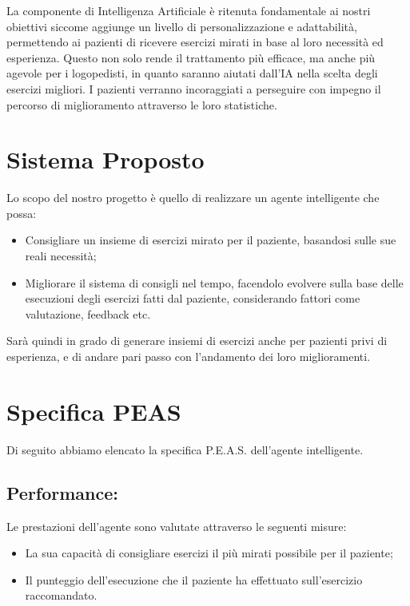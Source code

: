 \documentclass{article}
\begin{document}
    La componente di Intelligenza Artificiale è ritenuta fondamentale ai nostri obiettivi siccome aggiunge un livello di personalizzazione e adattabilità, permettendo ai pazienti di ricevere esercizi mirati in base al loro necessità ed esperienza. Questo non solo rende il trattamento più efficace, ma anche più agevole per i logopedisti, in quanto saranno aiutati dall'IA nella scelta degli esercizi migliori. I pazienti verranno incoraggiati a perseguire con impegno il percorso di miglioramento attraverso le loro statistiche.

    \section{Sistema Proposto}

    Lo scopo del nostro progetto è quello di realizzare un agente intelligente che possa:

    \begin{itemize}
        \item Consigliare un insieme di esercizi mirato per il paziente, basandosi sulle sue reali necessità;
        \item Migliorare il sistema di consigli nel tempo, facendolo evolvere sulla base delle esecuzioni degli esercizi fatti dal paziente, considerando fattori come valutazione, feedback etc.
    \end{itemize}

    Sarà quindi in grado di generare insiemi di esercizi anche per pazienti privi di esperienza, e di andare pari passo con l'andamento dei loro miglioramenti.

    \pagebreak

    \section{Specifica PEAS}

    Di seguito abbiamo elencato la specifica P.E.A.S. dell'agente intelligente.

    \subsection{Performance:}

    Le prestazioni dell’agente sono valutate attraverso le seguenti misure:

    \begin{itemize}
        \item La sua capacità di consigliare esercizi il più mirati possibile per il paziente;
        \item Il punteggio dell'esecuzione che il paziente ha effettuato sull'esercizio raccomandato.
    \end{itemize}
\end{document}
